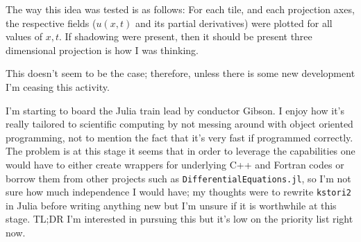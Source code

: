 \begin{description}
{\begin{description}
The way this idea was tested is as follows: For each tile, and each
projection axes, the respective fields ($u(x,t)$ and its partial
derivatives) were plotted for all values of $x,t$. If shadowing were
present, then it should be present three dimensional projection is how I
was thinking.

This doesn't seem to be the case; therefore, unless there
is some new development I'm ceasing this activity.

\item[Slowly learning Julia]
I'm starting to board the Julia train lead by conductor Gibson. I enjoy
how it's really tailored to scientific computing by not messing around
with object oriented programming, not to mention the fact that it's very
fast if programmed correctly. The problem is at this stage it seems that
in order to leverage the capabilities one would have to either create
wrappers for underlying C++ and Fortran codes or borrow them from other
projects such as \texttt{DifferentialEquations.jl}, so I'm not sure how
much independence I would have; my thoughts were to rewrite
\texttt{kstori2} in Julia before writing anything new but I'm unsure if
it is worthwhile at this stage. TL;DR I'm interested in pursuing this but
it's low on the priority list right now.

\end{description}
}

\end{description}

